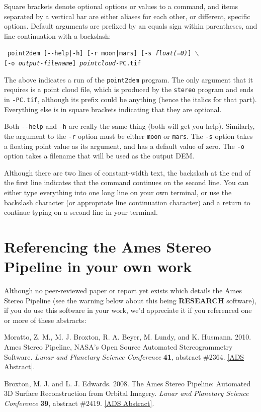 Square brackets denote optional options or values to a command, and
items separated by a vertical bar are either aliases for each other, or
different, specific options.  Default arguments are prefixed by an equals
sign within parentheses, and line continuation with a backslash:

\texttt{  point2dem [-\/-help|-h] [-r moon|mars] [-s \textit{float(=0)}] $\backslash$ } \\
\hspace*{6em}\texttt{[-o \textit{output-filename}] \textit{pointcloud}-PC.tif}

The above indicates a run of the \texttt{point2dem} program.  The
only argument that it requires is a point cloud file, which is
produced by the \texttt{stereo} program and ends in \texttt{-PC.tif},
although its prefix could be anything (hence the italics for that
part).  Everything else is in square brackets indicating that they
are optional.

Both \texttt{-\/-help} and \texttt{-h} are really the same thing (both
will get you help).  Similarly, the argument to the \texttt{-r}
option must be either \texttt{moon} or \texttt{mars}.  The \texttt{-s}
option takes a floating point value as its argument, and has a
default value of zero.  The \texttt{-o} option takes a filename
that will be used as the output \ac{DEM}.

Although there are two lines of constant-width text, the backslash at the end
of the first line indicates that the command continues on the second line.  You 
can either type everything into one long line on your own terminal, or use the
backslash character (or appropriate line continuation character) and a return to 
continue typing on a second line in your terminal.


\section{Referencing the Ames Stereo Pipeline in your own work}

Although no peer-reviewed paper or report yet exists which details the
Ames Stereo Pipeline (see the warning below about this being {\bf
  RESEARCH} software), if you do use this software in your work, we'd
appreciate it if you referenced one or more of these abstracts:

\begin{description}
\item Moratto, Z. M., M. J. Broxton, R. A. Beyer, M. Lundy, and K. Husmann.
2010. Ames Stereo Pipeline, NASA's Open Source Automated Stereogrammetry
Software. \textit{Lunar and Planetary Science Conference} \textbf{41},
abstract \#2364.
\href{http://adsabs.harvard.edu/abs/2010LPI....41.2364M}{[ADS Abstract]}.

\item Broxton, M. J. and L. J. Edwards. 2008. The Ames Stereo Pipeline:
Automated 3D Surface Reconstruction from Orbital Imagery. \textit{Lunar
and Planetary Science Conference} \textbf{39}, abstract \#2419.
\href{http://adsabs.harvard.edu/abs/2008LPI....39.2419B}{[ADS Abstract]}.
\end{description}

